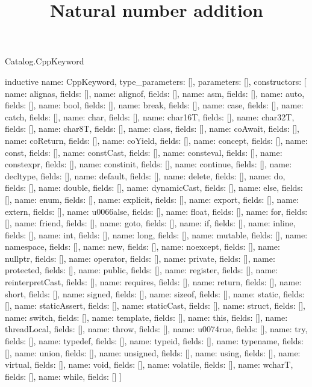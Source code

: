 \begin{lexlean}{Catalog.CppKeyword}
\title{Natural number addition}
\begin{semanticmodule}
inductive{
  name: CppKeyword,
  type_parameters: [],
  parameters: [],
  constructors: [
    {name: alignas, fields: []},
    {name: alignof, fields: []},
    {name: asm, fields: []},
    {name: auto, fields: []},
    {name: bool, fields: []},
    {name: break, fields: []},
    {name: case, fields: []},
    {name: catch, fields: []},
    {name: char, fields: []},
    {name: char16T, fields: []},
    {name: char32T, fields: []},
    {name: char8T, fields: []},
    {name: class, fields: []},
    {name: coAwait, fields: []},
    {name: coReturn, fields: []},
    {name: coYield, fields: []},
    {name: concept, fields: []},
    {name: const, fields: []},
    {name: constCast, fields: []},
    {name: consteval, fields: []},
    {name: constexpr, fields: []},
    {name: constinit, fields: []},
    {name: continue, fields: []},
    {name: decltype, fields: []},
    {name: default, fields: []},
    {name: delete, fields: []},
    {name: do, fields: []},
    {name: double, fields: []},
    {name: dynamicCast, fields: []},
    {name: else, fields: []},
    {name: enum, fields: []},
    {name: explicit, fields: []},
    {name: export, fields: []},
    {name: extern, fields: []},
    {name: u0066alse, fields: []},
    {name: float, fields: []},
    {name: for, fields: []},
    {name: friend, fields: []},
    {name: goto, fields: []},
    {name: if, fields: []},
    {name: inline, fields: []},
    {name: int, fields: []},
    {name: long, fields: []},
    {name: mutable, fields: []},
    {name: namespace, fields: []},
    {name: new, fields: []},
    {name: noexcept, fields: []},
    {name: nullptr, fields: []},
    {name: operator, fields: []},
    {name: private, fields: []},
    {name: protected, fields: []},
    {name: public, fields: []},
    {name: register, fields: []},
    {name: reinterpretCast, fields: []},
    {name: requires, fields: []},
    {name: return, fields: []},
    {name: short, fields: []},
    {name: signed, fields: []},
    {name: sizeof, fields: []},
    {name: static, fields: []},
    {name: staticAssert, fields: []},
    {name: staticCast, fields: []},
    {name: struct, fields: []},
    {name: switch, fields: []},
    {name: template, fields: []},
    {name: this, fields: []},
    {name: threadLocal, fields: []},
    {name: throw, fields: []},
    {name: u0074rue, fields: []},
    {name: try, fields: []},
    {name: typedef, fields: []},
    {name: typeid, fields: []},
    {name: typename, fields: []},
    {name: union, fields: []},
    {name: unsigned, fields: []},
    {name: using, fields: []},
    {name: virtual, fields: []},
    {name: void, fields: []},
    {name: volatile, fields: []},
    {name: wcharT, fields: []},
    {name: while, fields: []}
  ]
}
\end{semanticmodule}
\end{lexlean}
